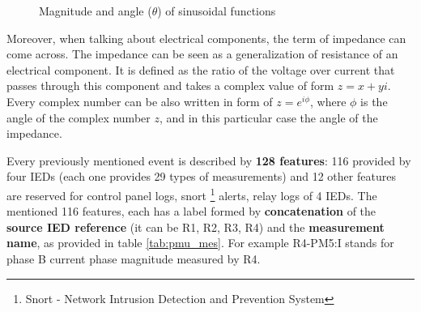 \begin{figure}[H]
    \centering
    \caption{Magnitude and angle ($\theta$) of sinusoidal functions} \label{fig:sin}
\end{figure}

Moreover, when talking about electrical components, the term of impedance can come across. The impedance can be seen as a generalization of resistance of an electrical component. It is defined as the ratio of the voltage over current that passes through this component and takes a complex value of form $z = x + yi$. Every complex number can be also written in form of $z = e^{i\phi}$, where $\phi$ is the angle of the complex number $z$, and in this particular case the angle of the impedance.

Every previously mentioned event is described by \textbf{128 features}: 116 provided by four IEDs (each one provides 29 types of measurements) and 12 other features are reserved for control panel logs, snort \footnote{Snort - Network Intrusion Detection and Prevention System} alerts, relay logs of 4 IEDs. The mentioned 116 features, each has a label formed by \textbf{concatenation} of the \textbf{source IED reference} (it can be R1, R2, R3, R4) and the \textbf{measurement name}, as provided in table \ref{tab:pmu_mes}. For example R4-PM5:I stands for phase B current phase magnitude measured by R4.

